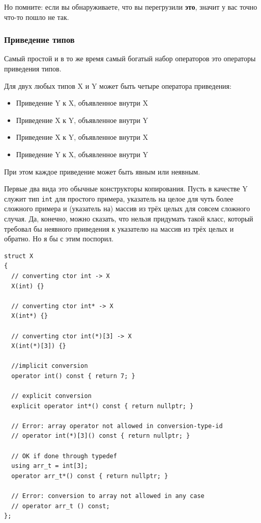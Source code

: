 \documentclass[a4paper,12pt,oneside]{article}
\begin{document}
Но помните: если вы обнаруживаете, что вы перегрузили \textbf{это}, значит у вас точно что-то пошло не так.

\subsubsection{Приведение типов}\label{CastOverloading}

Самый простой и в то же время самый богатый набор операторов это операторы приведения типов.

Для двух любых типов X и Y может быть четыре оператора приведения:

\begin{itemize}
\item Приведение Y к X, объявленное внутри X
\item Приведение X к Y, объявленное внутри Y
\item Приведение X к Y, объявленное внутри X
\item Приведение Y к X, объявленное внутри Y
\end{itemize}

При этом каждое приведение может быть явным или неявным.

Первые два вида это обычные конструкторы копирования. Пусть в качестве Y служит тип \lstinline!int! для простого примера, указатель на целое для чуть более сложного примера и (указатель на) массив из трёх целых для совсем сложного случая. Да, конечно, можно сказать, что нельзя придумать такой класс, который требовал бы неявного приведения к указателю на массив из трёх целых и обратно. Но я бы с этим поспорил.

\begin{lstlisting}
struct X 
{
  // converting ctor int -> X
  X(int) {}

  // converting ctor int* -> X
  X(int*) {}

  // converting ctor int(*)[3] -> X
  X(int(*)[3]) {}

  //implicit conversion
  operator int() const { return 7; }
 
  // explicit conversion
  explicit operator int*() const { return nullptr; }
 
  // Error: array operator not allowed in conversion-type-id
  // operator int(*)[3]() const { return nullptr; }

  // OK if done through typedef
  using arr_t = int[3];
  operator arr_t*() const { return nullptr; } 

  // Error: conversion to array not allowed in any case
  // operator arr_t () const; 
};
\end{lstlisting}
 
\end{document}
